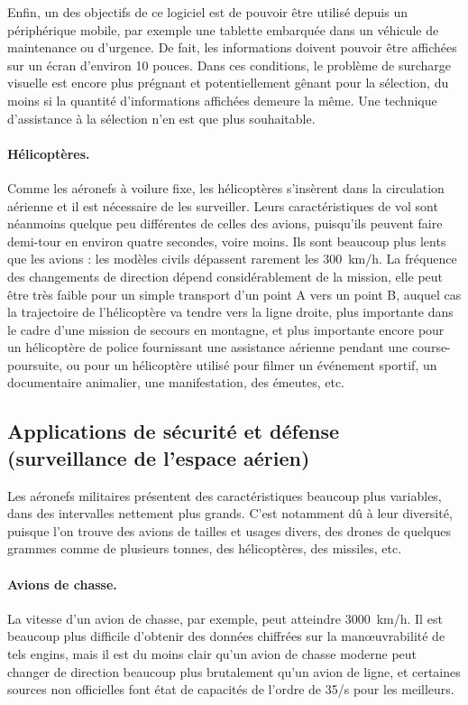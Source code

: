 	Enfin, un des objectifs de ce logiciel est de pouvoir être utilisé depuis un périphérique mobile, par exemple une tablette embarquée dans un véhicule de maintenance ou d'urgence. De fait, les informations doivent pouvoir être affichées sur un écran d'environ 10 pouces. Dans ces conditions, le problème de surcharge visuelle est encore plus prégnant et potentiellement gênant pour la sélection, du moins si la quantité d'informations affichées demeure la même. Une technique d'assistance à la sélection n'en est que plus souhaitable.

	\paragraph{Hélicoptères.}
	Comme les aéronefs à voilure fixe, les hélicoptères s'insèrent dans la circulation aérienne et il est nécessaire de les surveiller. Leurs caractéristiques de vol sont néanmoins quelque peu différentes de celles des avions, puisqu'ils peuvent faire demi-tour en environ quatre secondes, voire moins. Ils sont beaucoup plus lents que les avions : les modèles civils dépassent rarement les 300~km/h. La fréquence des changements de direction dépend considérablement de la mission, elle peut être très faible pour un simple transport d'un point A vers un point B, auquel cas la trajectoire de l'hélicoptère va tendre vers la ligne droite, plus importante dans le cadre d'une mission de secours en montagne, et plus importante encore pour un hélicoptère de police fournissant une assistance aérienne pendant une course-poursuite, ou pour un hélicoptère utilisé pour filmer un événement sportif, un documentaire animalier, une manifestation, des émeutes, etc.
	
	\subsection{Applications de sécurité et défense (surveillance de l'espace aérien)}
	Les aéronefs militaires présentent des caractéristiques beaucoup plus variables, dans des intervalles nettement plus grands. C'est notamment dû à leur diversité, puisque l'on trouve des avions de tailles et usages divers, des drones de quelques grammes comme de plusieurs tonnes, des hélicoptères, des missiles, etc.
	
	\paragraph{Avions de chasse.}
	La vitesse d'un avion de chasse, par exemple, peut atteindre 3000~km/h\footnotemark. Il est beaucoup plus difficile d'obtenir des données chiffrées sur la manœuvrabilité de tels engins, mais il est du moins clair qu'un avion de chasse moderne peut changer de direction beaucoup plus brutalement qu'un avion de ligne, et certaines sources non officielles font état de capacités de l'ordre de 35\textdegree{}/s pour les meilleurs\footnotemark.
	
